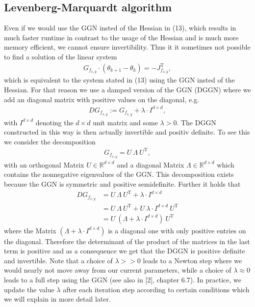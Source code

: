 \documentclass[conference]{IEEEtran}
\begin{document}
	\subsection{Levenberg-Marquardt algorithm }
	{\color{red} Even if we would use the GGN insted of the Hessian in (13), which results in much faster runtime in contrast to the usage of the Hessian and is much more memory efficient, we cannot ensure invertibility.} Thus it it sometimes not possible to find a solution of the linear system
	\begin{align}
	G_{f_{x, y}}\cdot(\theta_{k+1} - \theta_{k}) = -J_{f_{x, y}}^{\mathrm{T}},
	\end{align}
	which is equivalent to the system stated in (13) using the GGN insted of the Hessian.
	For that reason we use a damped version of the GGN (DGGN) where we add an diagonal matrix with positive values on the diagonal, e.g.
	\begin{align}
	DG_{f_{x, y}} := G_{f_{x, y}} + \lambda\cdot I^{d\times d},
	\end{align}
	with $I^{d\times d}$ denoting the $d\times d$ unit matrix and some $\lambda>0$.
	{\color{red}The DGGN constructed in this way is then actually invertible and positiv definite. 
	To see this} we consider the decomposition
	\begin{align}
	G_{f_{x, y}} = U\:\Lambda\:U^{\mathrm{T}},
	\end{align}
	with an orthogonal Matrix $U\in\mathbb{R}^{d\times d}$ and a diagonal Matrix $\Lambda\in\mathbb{R}^{d\times d}$ which contains the nonnegative eigenvalues of the GGN. This decomposition exists because the GGN is symmetric and positive semidefinite. Further it holds that
	\begin{align}
	DG_{f_{x, y}} &= U\:\Lambda\:U^{\mathrm{T}} + \lambda\cdot I^{d\times d}\\
	&= U\:\Lambda\:U^{\mathrm{T}} + U\:\lambda\cdot I^{d\times d}\:U^{\mathrm{T}}\\
	&= U\:\left(\Lambda + \lambda\cdot I^{d\times d}\right)\:U^{\mathrm{T}}
	\end{align}
	where the Matrix $\left(\Lambda + \lambda\cdot I^{d\times d}\right)$ is a diagonal one with only positive entries on the diagonal. Therefore the determinant of the product of the matrices in the last term is positive and as a consequence we get that the DGGN is positive definite and invertible.
	Note that a choice of $\lambda>>0$ leads to a Newton step where we would nearly not move away from our current parameters, while a choice of $\lambda\approx 0$ leads to a full step using the GGN (see also in [2], chapter 6.7). In practice, we update the value $\lambda$ after each iteration step according to certain conditions which we will explain in more detail later.
	
\end{document}
